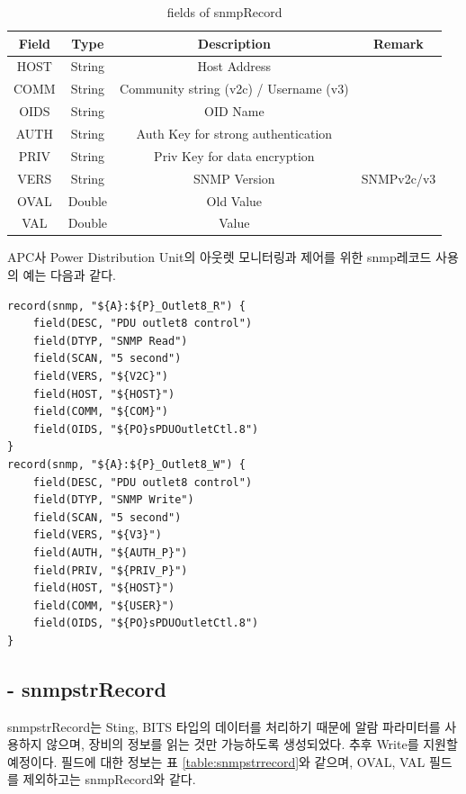 \documentclass[11pt
  , a4paper
  , article
  , oneside
]{memoir}
\begin{document}
\begin{table}[!h]
\begin{center}
\begin{tabular}{cccc}\hline
Field & Type & Description & Remark\\ \hline
HOST & String & Host Address \\ \hline
COMM & String & Community string (v2c) / Username (v3) \\ \hline
OIDS & String & OID Name \\ \hline
AUTH & String & Auth Key for strong authentication \\ \hline
PRIV & String & Priv Key for data encryption\\ \hline
VERS & String & SNMP Version & SNMPv2c/v3	 \\ \hline
OVAL & Double & Old Value \\ \hline
VAL & Double & Value \\ \hline
\end{tabular}
\caption{fields of snmpRecord}
\label{table:snmprecord} 
\end{center}
\end{table} 

APC사 Power Distribution Unit의 아웃렛 모니터링과 제어를 위한 snmp레코드 사용의 예는 다음과 같다.

{\scriptsize
\begin{verbatim}
record(snmp, "${A}:${P}_Outlet8_R") {
    field(DESC, "PDU outlet8 control")
    field(DTYP, "SNMP Read")
    field(SCAN, "5 second")
    field(VERS, "${V2C}")
    field(HOST, "${HOST}")
    field(COMM, "${COM}")
    field(OIDS, "${PO}sPDUOutletCtl.8")
}
record(snmp, "${A}:${P}_Outlet8_W") {
    field(DESC, "PDU outlet8 control")
    field(DTYP, "SNMP Write")
    field(SCAN, "5 second")
    field(VERS, "${V3}")
    field(AUTH, "${AUTH_P}")
    field(PRIV, "${PRIV_P}")
    field(HOST, "${HOST}")
    field(COMM, "${USER}")
    field(OIDS, "${PO}sPDUOutletCtl.8")
}
\end{verbatim}
}

\subsection{- snmpstrRecord}
snmpstrRecord는 Sting, BITS 타입의 데이터를 처리하기 때문에 알람 파라미터를 사용하지 않으며, 장비의 정보를 읽는 것만 가능하도록 생성되었다. 추후 Write를 지원할 예정이다. 필드에 대한 정보는 표 \ref{table:snmpstrrecord}와 같으며, OVAL, VAL 필드를 제외하고는 snmpRecord와 같다. 
\end{document}

